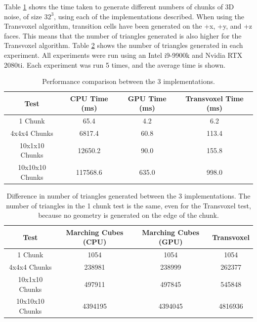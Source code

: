 \documentclass[11pt]{article}
\begin{document}
Table \ref{tab:comparison-time} shows the time taken to generate different numbers of chunks of 3D noise, of size $32^3$, using each of the implementations described. When using the Transvoxel algorithm, transition cells have been generated on the +x, +y, and +z faces. This means that the number of triangles generated is also higher for the Transvoxel algorithm. Table \ref{tab:comparison-tris} shows the number of triangles generated in each experiment. All experiments were run using an Intel i9-9900k and Nvidia RTX 2080ti. Each experiment was run 5 times, and the average time is shown.
\begin{table}[H]
  \begin{tabular}{|c|c|c|c|}
    \hline
    Test & CPU Time (ms) & GPU Time (ms) & Transvoxel Time (ms)\\
    \hline
    \hline
    1 Chunk & 65.4 & 4.2 & 6.2\\
    4x4x4 Chunks &  6817.4 & 60.8 & 113.4\\
    10x1x10 Chunks & 12650.2 & 90.0 & 155.8\\
    10x10x10 Chunks & 117568.6 & 635.0 & 998.0\\
    \hline
    
  \end{tabular}
  \caption{\label{tab:comparison-time}Performance comparison between the 3 implementations.}
\end{table}


\begin{table}[H]
  \begin{tabular}{|c|c|c|c|}
    \hline
    Test & Marching Cubes (CPU) & Marching Cubes (GPU) & Transvoxel\\
    \hline
    \hline
    1 Chunk & 1054 & 1054 & 1054\\
    4x4x4 Chunks & 238981 & 238999 & 262377\\
    10x1x10 Chunks & 497911 & 497845 & 545848\\
    10x10x10 Chunks & 4394195 & 4394045 & 4816936\\
    \hline
  \end{tabular}
  \caption{\label{tab:comparison-tris}Difference in number of triangles generated between the 3 implementations. The number of triangles in the 1 chunk test is the same, even for the Transvoxel test, because no geometry is generated on the edge of the chunk.}
\end{table}
\end{document}
